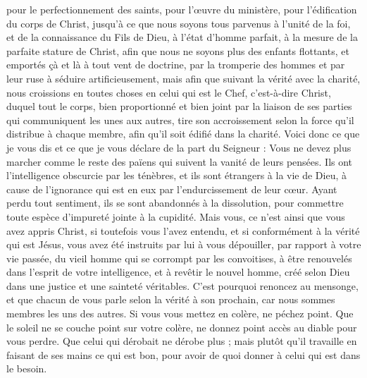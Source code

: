 \begin{multicols}{2}
pour le perfectionnement des saints, pour l’œuvre du ministère, pour l'édification du corps de Christ,
jusqu'à ce que nous soyons tous parvenus à l'unité de la foi, et de la connaissance du Fils de Dieu, à l'état d'homme parfait, à la mesure de la parfaite stature de Christ,
afin que nous ne soyons plus des enfants flottants, et emportés çà et là à tout vent de doctrine, par la tromperie des hommes et par leur ruse à séduire artificieusement,
mais afin que suivant la vérité avec la charité, nous croissions en toutes choses en celui qui est le Chef, c'est-à-dire Christ,
duquel tout le corps, bien proportionné et bien joint par la liaison de ses parties qui communiquent les unes aux autres, tire son accroissement selon la force qu’il distribue à chaque membre, afin qu’il soit édifié dans la charité.
Voici donc ce que je vous dis et ce que je vous déclare de la part du Seigneur : Vous ne devez plus marcher comme le reste des païens qui suivent la vanité de leurs pensées.
Ils ont l’intelligence obscurcie par les ténèbres, et ils sont étrangers à la vie de Dieu, à cause de l'ignorance qui est en eux par l'endurcissement de leur cœur.
Ayant perdu tout sentiment, ils se sont abandonnés à la dissolution, pour commettre toute espèce d’impureté jointe à la cupidité.
Mais vous, ce n’est ainsi que vous avez appris Christ,
si toutefois vous l'avez entendu, et si conformément à la vérité qui est Jésus, vous avez été instruits par lui à vous dépouiller,
par rapport à votre vie passée, du vieil homme qui se corrompt par les convoitises,
à être renouvelés dans l'esprit de votre intelligence,
et à revêtir le nouvel homme, créé selon Dieu dans une justice et une sainteté véritables.
C'est pourquoi renoncez au mensonge, et que chacun de vous parle selon la vérité à son prochain, car nous sommes membres les uns des autres.
Si vous vous mettez en colère, ne péchez point. Que le soleil ne se couche point sur votre colère,
ne donnez point accès au diable pour vous perdre.
Que celui qui dérobait ne dérobe plus ; mais plutôt qu’il travaille en faisant de ses mains ce qui est bon, pour avoir de quoi donner à celui qui est dans le besoin.

\end{multicols}
